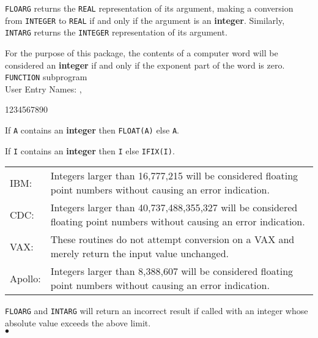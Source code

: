                            
                
\Submitter{}                                  
\begin{center}
\end{center}
{\tt FLOARG} returns the {\tt REAL} representation of its argument,
making a conversion from {\tt INTEGER} to {\tt REAL} if and only if
the argument is an {\bf integer}. Similarly, {\tt INTARG} returns the
{\tt INTEGER} representation of its argument.
\par
For the purpose of this package, the contents of a computer word will
be considered an {\bf integer} if and only if the exponent part of the
word is zero.
\Structure
{\tt FUNCTION} subprogram \\
User Entry Names: , 
\Usage
\begin{DLtt}{1234567890}
\item [FLOARG(A):] If {\tt A} contains an {\bf integer} then
{\tt FLOAT(A)} else {\tt A}.
\item [INTARG(I):] If {\tt I} contains an {\bf integer} then
{\tt I} else {\tt IFIX(I)}.
\end{DLtt}
\Restrict
\begin{tabular}{ll}
IBM: & \parbox[t]{146mm}{
Integers larger than 16,777,215 will be considered
floating point numbers without causing an error indication.} \\
CDC: & \parbox[t]{146mm}{
Integers larger than 40,737,488,355,327 will be considered
floating point numbers without causing an error indication.} \\
VAX: & \parbox[t]{146mm}{
These routines do not attempt conversion on a VAX and merely
return the input value unchanged.} \\
Apollo: & \parbox[t]{146mm}{
Integers larger than 8,388,607 will be considered
floating point numbers without causing an error indication.}
\end{tabular}
\Notes
{\tt FLOARG} and {\tt INTARG} will return an incorrect result if called
with an integer whose absolute value exceeds the above limit.
\\ $\bullet$
